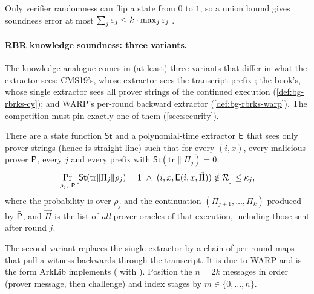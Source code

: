 Only verifier randomness can flip a state from $0$ to $1$, so a union bound gives soundness error
at most $\sum_j\varepsilon_j\le k\cdot\max_j\varepsilon_j$ \cite[Claim~31.1.3]{CY24-Book}.

\paragraph{RBR knowledge soundness: three variants.} The knowledge analogue
\cite{CMS19,COS20} comes in (at least) three variants that differ in what the extractor sees:
CMS19's, whose extractor sees the transcript prefix \cite[Def.~8.5]{CMS19}; the book's, whose
single extractor sees all prover strings of the continued execution \cite[Def.~31.1.6]{CY24-Book}
(\cref{def:bg-rbrks-cy}); and WARP's per-round backward extractor \cite[Defs.~4.1--4.2]{BCFW25-WARP}
(\cref{def:bg-rbrks-warp}). The competition must pin exactly one of them (\cref{sec:security}).

\begin{definition}\label{def:bg-rbrks-cy}
There are a state function $\mathsf{St}$ and a polynomial-time extractor $\mathsf{E}$ that sees only
prover strings (hence is straight-line) such that for every $(i,x)$, every malicious prover
$\tilde{\mathsf{P}}$, every $j$ and every prefix with $\mathsf{St}(\mathrm{tr}\|\Pi_j)=0$,
\[ \Pr_{\rho_j,\ \tilde\Prv}\bigl[\mathsf{St}(\mathrm{tr}\|\Pi_j\|\rho_j)=1 \ \wedge\
   (i,x,\Ext(i,x,\vec\Pi))\notin\R\bigr]\le\kappa_j , \]
where the probability is over $\rho_j$ and the continuation $(\Pi_{j+1},\dots,\Pi_k)$ produced by
$\tilde{\mathsf{P}}$, and $\vec\Pi$ is the list of \emph{all} prover oracles of that execution, including
those sent after round $j$.
\end{definition}

The second variant replaces the single extractor by a chain of per-round maps that pull a witness
backwards through the transcript. It is due to WARP \cite[Defs.~4.1--4.2, informally
2.6--2.7]{BCFW25-WARP} and is the
form ArkLib implements ( with ).
Position the $n=2k$ messages in order (prover message, then challenge) and index stages by
$m\in\{0,\dots,n\}$.

